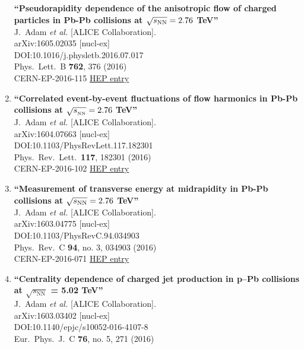 \begin{enumerate}
{\bf ``Pseudorapidity dependence of the anisotropic flow of charged particles in Pb-Pb collisions at $\sqrt{s_{\rm NN}}=2.76$ TeV''}
  \\{}J.~Adam {\it et al.} [ALICE Collaboration].
  \\{}arXiv:1605.02035 [nucl-ex]
  \\{}DOI:10.1016/j.physletb.2016.07.017
  \\{}Phys.\ Lett.\ B {\bf 762}, 376 (2016)
  \\{}CERN-EP-2016-115
\href{http://inspirehep.net/record/1456145}{HEP entry}
\item%
{\bf ``Correlated event-by-event fluctuations of flow harmonics in Pb-Pb collisions at $\sqrt{s_{_{\rm NN}}}=2.76$ TeV''}
  \\{}J.~Adam {\it et al.} [ALICE Collaboration].
  \\{}arXiv:1604.07663 [nucl-ex]
  \\{}DOI:10.1103/PhysRevLett.117.182301
  \\{}Phys.\ Rev.\ Lett.\  {\bf 117}, 182301 (2016)
  \\{}CERN-EP-2016-102
\href{http://inspirehep.net/record/1452590}{HEP entry}
\item%
{\bf ``Measurement of transverse energy at midrapidity in Pb-Pb collisions at $\sqrt{s_{\rm NN}} = 2.76$ TeV''}
  \\{}J.~Adam {\it et al.} [ALICE Collaboration].
  \\{}arXiv:1603.04775 [nucl-ex]
  \\{}DOI:10.1103/PhysRevC.94.034903
  \\{}Phys.\ Rev.\ C {\bf 94}, no. 3, 034903 (2016)
  \\{}CERN-EP-2016-071
\href{http://inspirehep.net/record/1427723}{HEP entry}
\item%
{\bf ``Centrality dependence of charged jet production in p–Pb collisions at $\sqrt{s_\mathrm{NN}}$ = 5.02 TeV''}
  \\{}J.~Adam {\it et al.} [ALICE Collaboration].
  \\{}arXiv:1603.03402 [nucl-ex]
  \\{}DOI:10.1140/epjc/s10052-016-4107-8
  \\{}Eur.\ Phys.\ J.\ C {\bf 76}, no. 5, 271 (2016)

\end{enumerate}
